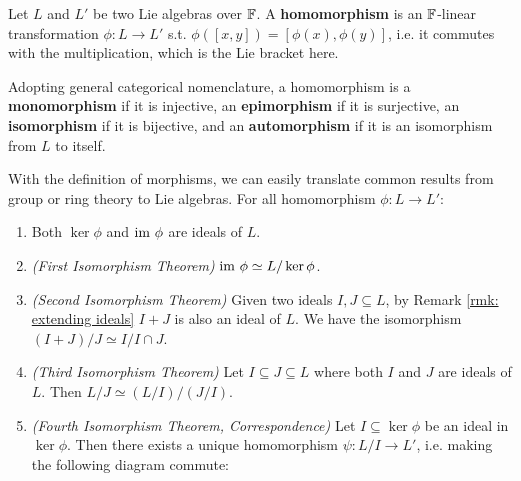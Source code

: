 \documentclass{article}
\begin{document}
\begin{definition}[Morphism]
    Let $L$ and $L'$ be two Lie algebras over $\mathbb{F}$. A \textbf{homomorphism} is an $\mathbb{F}$-linear transformation $\phi: L \to L'$ s.t. $\phi([x, y]) = [\phi(x), \phi(y)]$, i.e. it commutes with the multiplication, which is the Lie bracket here.

    Adopting general categorical nomenclature, a homomorphism is a \textbf{monomorphism} if it is injective, an \textbf{epimorphism} if it is surjective, an \textbf{isomorphism} if it is bijective, and an \textbf{automorphism} if it is an isomorphism from $L$ to itself.
\end{definition}
\nogap
\begin{remark}\label{rmk: extending morphism results}
    With the definition of morphisms, we can easily translate common results from group or ring theory to Lie algebras. For all homomorphism $\phi: L \to L'$:
    \begin{enumerate}
        \item Both $\ker \phi$ and $\mathrm{im}\  \phi$ are ideals of $L$.
        \item \emph{(First Isomorphism Theorem)} $\mathrm{im}\  \phi \simeq L/\ker \phi$.
        \item \emph{(Second Isomorphism Theorem)} Given two ideals $I, J \subseteq L$, by Remark \ref{rmk: extending ideals} $I + J$ is also an ideal of $L$. We have the isomorphism $(I + J)/J \simeq I/I \cap J$.
        \item \emph{(Third Isomorphism Theorem)} Let $I \subseteq J \subseteq L$ where both $I$ and $J$ are ideals of $L$. Then $L/J \simeq (L/I)/(J/I)$.
        \item \emph{(Fourth Isomorphism Theorem, Correspondence)} Let $I \subseteq \ker \phi$ be an ideal in $\ker \phi$. Then there exists a unique homomorphism $\psi: L/I \to L'$, i.e. making the following diagram commute:
        
        \begin{minipage}{\linewidth}
            \centering
        \end{minipage}
    \end{enumerate}
    \ 
\end{remark}
\end{document}
